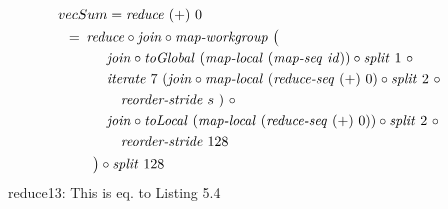 \begin{align}
  &\hspace{-1.5em}vecSum = \reduce\ (+)\ 0\nonumber\\
  &\hspace{-2em}\quad\begin{aligned}
    &=\hspace{.2em}
      \reduce \circ \join \circ \mapWorkgroup\ \big(\\
    &\qquad\quad\join \circ \toGlobal\ (\mapLocal\ (\mapSeq\ \id)) \circ \splitN\ 1\ \circ\\
    &\qquad\quad\iterateN\ 7\ (\join \circ \mapLocal\ (\reduceSeq\ (+)\ 0) \circ \splitN\ 2\ \circ\\
    &\qquad\qquad \reorderStride\ s\ )\ \circ\\
    &\qquad\quad\join \circ \toLocal\ (\mapLocal\ (\reduceSeq\ (+)\ 0)) \circ \splitN\ 2\ \circ\\
    &\qquad\qquad\reorderStride\ 128\\
    &\qquad\big) \circ \splitN\ 128
  \end{aligned}
\end{align}
reduce13: This is eq. to Listing 5.4











